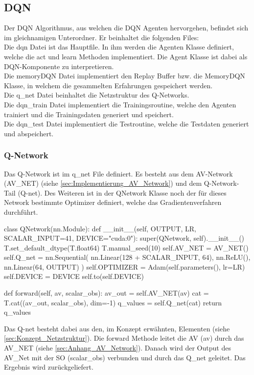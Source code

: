\subsection{DQN}
Der DQN Algorithmus, aus welchen die DQN Agenten hervorgehen, befindet sich im gleichnamigen Unterordner. Er beinhaltet die folgenden Files:\\
Die dqn Datei ist das Hauptfile. In ihm werden die Agenten Klasse definiert, welche die act und learn Methoden implementiert. Die Agent Klasse ist dabei als DQN-Komponente zu interpretieren.\\
Die memoryDQN Datei implementiert den Replay Buffer bzw. die MemoryDQN Klasse, in welchem die gesammelten Erfahrungen gespeichert werden.\\
Die q\_net Datei beinhaltet die Netzstruktur des Q-Networks.\\
Die dqn\_train Datei implementiert die Trainingsroutine, welche den Agenten trainiert und die Trainingsdaten generiert und speichert.\\
Die dqn\_test Datei implementiert die Testroutine, welche die Testdaten generiert und abspeichert.

\subsubsection{Q-Network} \label{sec:Implementierung_Q-Network}
Das Q-Network ist im q\_net File definiert.
Es besteht aus dem AV-Network (AV\_NET) (siehe \ref{sec:Implementierung_AV_Network}) und dem Q-Network-Tail (Q-net). Des Weiteren ist in der QNetwork Klasse noch der für dieses Network bestimmte Optimizer definiert, welche das Gradientenverfahren durchführt.
\begin{python}
	class QNetwork(nn.Module):
		def __init__(self, OUTPUT, LR, SCALAR_INPUT=41, DEVICE="cuda:0"):
			super(QNetwork, self).__init__()
			T.set_default_dtype(T.float64)
			T.manual_seed(10)
			self.AV_NET = AV_NET()
			self.Q_net = nn.Sequential(
				nn.Linear(128 + SCALAR_INPUT, 64),
				nn.ReLU(),
				nn.Linear(64, OUTPUT)
			)
			self.OPTIMIZER = Adam(self.parameters(), lr=LR)
			self.DEVICE = DEVICE
			self.to(self.DEVICE)
	
		def forward(self, av, scalar_obs):
			av_out = self.AV_NET(av)
			cat = T.cat((av_out, scalar_obs), dim=-1)
			q_values = self.Q_net(cat)
			return q_values
\end{python}
Das Q-net besteht dabei aus den, im Konzept erwähnten, Elementen (siehe \ref{sec:Konzept_Netzstruktur}).
Die forward Methode leitet die AV (av) durch das AV\_NET (siehe \ref{sec:Anhang_AV_Network}). Danach wird der Output des AV\_Net mit der SO (scalar\_obs) verbunden und durch das Q\_net geleitet. Das Ergebnis wird zurückgeliefert.

